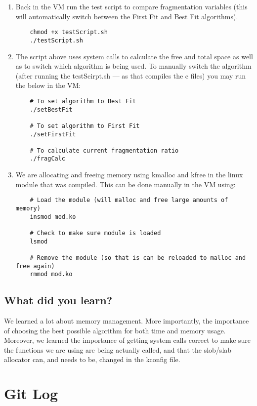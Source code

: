 \documentclass[onecolumn, draftclsnofoot,10pt, compsoc]{IEEEtran}
\begin{document}
\begin{enumerate}
	\item Back in the VM run the test script to compare fragmentation variables (this will automatically switch between the First Fit and Best Fit algorithms).
	\begin{lstlisting}
    chmod +x testScript.sh
    ./testScript.sh
	\end{lstlisting}
	
	\item The script above uses system calls to calculate the free and total space as well as to switch which algorithm is being used.  To manually switch the algorithm (after running the testScirpt.sh --- as that compiles the c files) you may run the below in the VM:
	\begin{lstlisting}
    # To set algorithm to Best Fit
    ./setBestFit
	
    # To set algorithm to First Fit
    ./setFirstFit
    
    # To calculate current fragmentation ratio
    ./fragCalc
	\end{lstlisting}
	
	\item We are allocating and freeing memory using kmalloc and kfree in the linux module that was compiled.  This can be done manually in the VM using:
	\begin{lstlisting}
    # Load the module (will malloc and free large amounts of memory)
    insmod mod.ko
	
    # Check to make sure module is loaded
    lsmod
	
    # Remove the module (so that is can be reloaded to malloc and free again)
    rmmod mod.ko
	\end{lstlisting}

\end{enumerate}

\subsection{What did you learn?}
We learned a lot about memory management. More importantly, the importance of choosing the best possible algorithm for both time and memory usage. Moreover, we learned the importance of getting system calls correct to make sure the functions we are using are being actually called, and that the slob/slab allocator can, and needs to be, changed in the kconfig file.


\section{Git Log}
\end{document}
